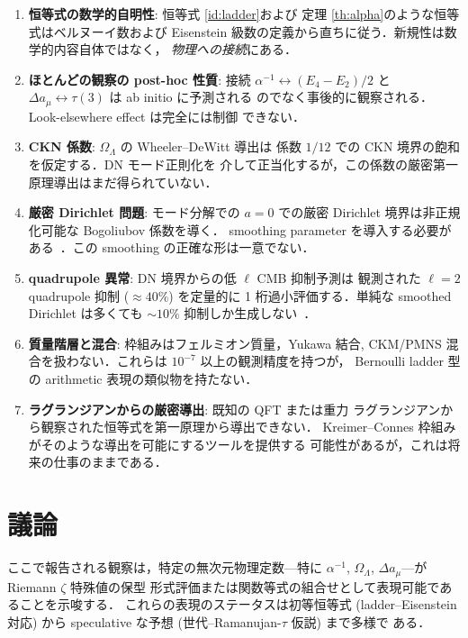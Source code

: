 \documentclass[11pt,a4paper]{article}
\begin{document}
\begin{enumerate}
\item \textbf{恒等式の数学的自明性}: 恒等式 \ref{id:ladder}および
定理 \ref{th:alpha}のような恒等式はベルヌーイ数および Eisenstein
級数の定義から直ちに従う．新規性は数学的内容自体ではなく，
\emph{物理への接続}にある．

\item \textbf{ほとんどの観察の post-hoc 性質}: 接続
$\alpha^{-1} \leftrightarrow (E_4 - E_2)/2$ と
$\Delta a_\mu \leftrightarrow \tau(3)$ は ab initio に予測される
のでなく事後的に観察される．Look-elsewhere effect は完全には制御
できない．

\item \textbf{CKN 係数}: $\Omega_\Lambda$ の Wheeler--DeWitt 導出は
係数 $1/12$ での CKN 境界の飽和を仮定する．DN モード正則化を
介して正当化するが，この係数の厳密第一原理導出はまだ得られていない．

\item \textbf{厳密 Dirichlet 問題}: モード分解での $a = 0$ での厳密
Dirichlet 境界は非正規化可能な Bogoliubov 係数を導く．
smoothing parameter を導入する必要がある~\cite{wb-low-ell}．この
smoothing の正確な形は一意でない．

\item \textbf{quadrupole 異常}: DN 境界からの低 $\ell$ CMB 抑制予測は
観測された $\ell = 2$ quadrupole 抑制 ($\approx 40\%$) を定量的に
1 桁過小評価する．単純な smoothed Dirichlet は多くても $\sim 10\%$
抑制しか生成しない~\cite{wb-low-ell}．

\item \textbf{質量階層と混合}: 枠組みはフェルミオン質量，Yukawa 結合,
CKM/PMNS 混合を扱わない．これらは $10^{-7}$ 以上の観測精度を持つが，
Bernoulli ladder 型の arithmetic 表現の類似物を持たない．

\item \textbf{ラグランジアンからの厳密導出}: 既知の QFT または重力
ラグランジアンから観察された恒等式を第一原理から導出できない．
Kreimer--Connes 枠組みがそのような導出を可能にするツールを提供する
可能性があるが，これは将来の仕事のままである．
\end{enumerate}

\section{議論}

ここで報告される観察は，特定の無次元物理定数---特に $\alpha^{-1}$,
$\Omega_\Lambda$, $\Delta a_\mu$---が Riemann $\zeta$ 特殊値の保型
形式評価または関数等式の組合せとして表現可能であることを示唆する．
これらの表現のステータスは初等恒等式 (ladder--Eisenstein 対応)
から speculative な予想 (世代--Ramanujan-$\tau$ 仮説) まで多様で
ある．
\end{document}
